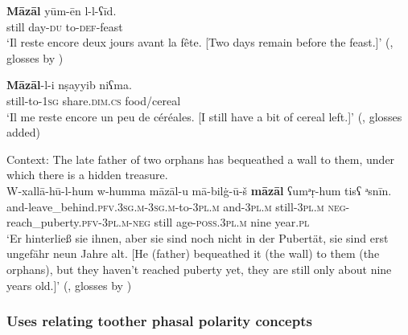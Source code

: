 \begin{exe}

	\ex\label{appendixTunisianMazalScalar1}
	\gll \textbf{Māzāl} yūm-ēn  l-l-ʕīd.\\
	still day-\textsc{du}  to-\textsc{def}-feast\\
	\glt \lq Il reste encore deux jours avant la fête. [Two days remain before the feast.]\rq{ }	(\cite[1736]{MarcaisGuiga19581961}, glosses by \cite{FischerEtAlTunisian})	
	
	\ex\label{appendixTunisianMazalScalar2}
	\gll \textbf{Māzāl}-l-i nṣayyib niʕma.\\
	still-to-1\textsc{sg} share.\textsc{dim}.\textsc{cs} food/cereal\\
	\glt \lq Il me reste encore un peu de céréales. [I still have a bit of cereal left.]\rq{ }(\cite[1736]{MarcaisGuiga19581961}, glosses added)

	\ex\label{appendixTunisianMazalScalar3}
	Context: The late father of two orphans has bequeathed a wall to them, under which there is a hidden treasure.\\
	\gll W-xallā-hū-l-hum w-humma māzāl-u mā-bilġ-ū-š	\textbf{māzāl} ʕumᵊṛ-hum tisʕ ᵊsnīn.\\
	and-leave\_behind.\textsc{pfv}.3\textsc{sg}.\textsc{m}-3\textsc{sg}.\textsc{m}-to-3\textsc{pl}.\textsc{m} and-3\textsc{pl}.\textsc{m} still-3\textsc{pl}.\textsc{m} \textsc{neg}-reach\_puberty.\textsc{pfv}-3\textsc{pl}.\textsc{m}-\textsc{neg} still age-\textsc{poss}.3\textsc{pl}.\textsc{m} nine year.\textsc{pl}\\
	\glt \lq Er hinterließ sie ihnen, aber sie sind noch nicht in der Pubertät, sie sind erst ungefähr neun Jahre alt. [He (father) bequeathed it (the wall) to them (the orphans), but they haven’t reached puberty yet, they are still only about nine years old.]\rq{ }(\cite[220–221]{RittBenmimoun2011}, glosses by \cite{FischerEtAlTunisian})
\end{exe}

\subsubsection{Uses relating toother phasal polarity concepts}
